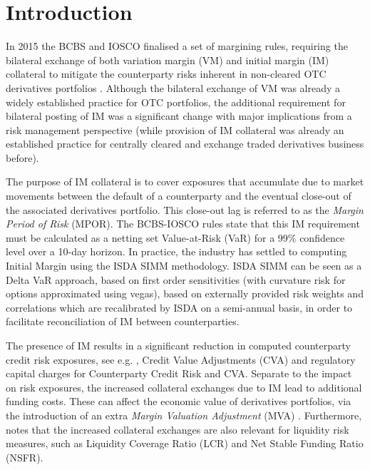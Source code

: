 \documentclass[11pt,a4paper,oneside]{article}
\begin{document}

\thispagestyle{empty}

\tableofcontents

\newpage

\section{Introduction} \label{sec:intro}

In 2015 the BCBS and IOSCO finalised a set of margining rules, requiring the bilateral exchange of both variation
margin (VM) and initial margin (IM) collateral to mitigate the counterparty risks inherent in non-cleared OTC
derivatives portfolios \cite{IMBIS}. Although the bilateral exchange of VM was already a widely established practice for 
OTC portfolios, the additional requirement for bilateral posting of IM was a significant change with major 
implications from a risk management perspective (while provision of IM collateral was already an established
practice for centrally cleared and exchange traded derivatives business before).

The purpose of IM collateral is to cover exposures that accumulate due to market movements between the 
default of a counterparty and the eventual close-out of the associated derivatives portfolio. This close-out 
lag is referred to as the \emph{Margin Period of Risk} (MPOR). The BCBS-IOSCO rules state that this IM 
requirement must be calculated as a netting set Value-at-Risk (VaR) for a 99\% confidence level over a 10-day horizon.
In practice, the industry has settled to computing Initial Margin using the ISDA SIMM\texttrademark \cite{ISDASIMM}
methodology. ISDA SIMM can be seen as a Delta VaR approach, based on first order sensitivities (with
curvature risk for options approximated using vegas), based on externally provided risk weights
and correlations which are recalibrated by ISDA on a semi-annual basis, in order to facilitate reconciliation of IM
between counterparties.

The presence of IM results in a significant reduction in computed counterparty credit risk exposures, see e.g. \cite{PykhtinDIM},
Credit Value Adjustments (CVA) and regulatory capital charges for Counterparty Credit Risk and CVA.
Separate to the impact on risk exposures, the increased collateral exchanges due to IM lead to additional funding 
costs. These can affect the economic value of derivatives portfolios, via the introduction of an extra
\emph{Margin Valuation Adjustment} (MVA) \cite{green2014im}. Furthermore, \cite{FabrizioAnfusoDIM} notes that the
increased collateral exchanges are also relevant for liquidity risk measures, such as Liquidity Coverage Ratio (LCR)
and Net Stable Funding Ratio (NSFR).
\end{document}
